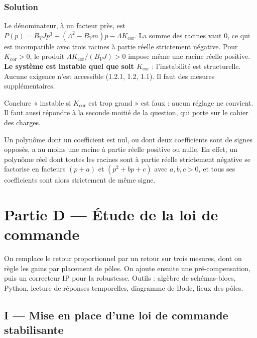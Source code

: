 \documentclass[11pt,a4paper]{article}
\begin{document}
\hypertarget{solution-15}{%
\subsubsection{Solution}\label{solution-15}}

Le dénominateur, à un facteur près, est \(P(p)=B_VJp^3+(\Lambda^2-B_Vm)p-\Lambda K_{\text{cor}}\). La somme des racines vaut \(0\), ce qui est incompatible avec trois racines à partie réelle strictement négative. Pour \(K_{\text{cor}}>0\), le produit \(\Lambda K_{\text{cor}}/(B_VJ)>0\) impose même une racine réelle positive. \textbf{Le système est instable quel que soit \(K_{\text{cor}}\)} : l'instabilité est structurelle. Aucune exigence n'est accessible (1.2.1, 1.2, 1.1). Il faut des mesures supplémentaires.

\begin{piege}

Conclure « instable si \(K_{\text{cor}}\) est trop grand » est faux : aucun réglage ne convient. Il faut aussi répondre à la seconde moitié de la question, qui porte sur le cahier des charges.

\end{piege}

\begin{methode}

Un polynôme dont un coefficient est nul, ou dont deux coefficients sont de signes opposés, a au moins une racine à partie réelle positive ou nulle. En effet, un polynôme réel dont toutes les racines sont à partie réelle strictement négative se factorise en facteurs \((p+a)\) et \((p^2+bp+c)\) avec \(a,b,c>0\), et tous ses coefficients sont alors strictement de même signe.

\end{methode}

\hypertarget{partie-d-uxe9tude-de-la-loi-de-commande}{%
\section{Partie D --- Étude de la loi de commande}\label{partie-d-uxe9tude-de-la-loi-de-commande}}

On remplace le retour proportionnel par un retour sur trois mesures, dont on règle les gains par placement de pôles. On ajoute ensuite une pré-compensation, puis un correcteur IP pour la robustesse. Outils : algèbre de schémas-blocs, Python, lecture de réponses temporelles, diagramme de Bode, lieux des pôles.

\hypertarget{i-mise-en-place-dune-loi-de-commande-stabilisante}{%
\subsection{I --- Mise en place d'une loi de commande stabilisante}\label{i-mise-en-place-dune-loi-de-commande-stabilisante}}
\end{document}
